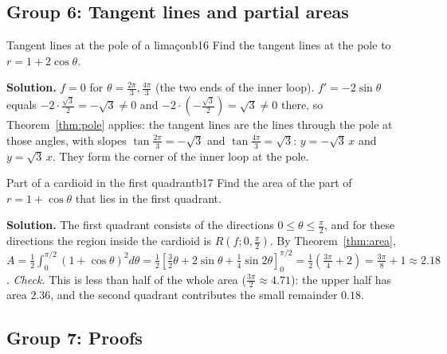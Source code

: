 \documentclass[11pt]{article}
\begin{document}
\subsection*{Group 6: Tangent lines and partial areas}

\begin{exmp}{Tangent lines at the pole of a limaçon}{b16}
Find the tangent lines at the pole to $r=1+2\cos\theta$.

\textbf{Solution.} $f=0$ for $\theta=\frac{2\pi}3,\frac{4\pi}3$ (the two ends of the inner loop). $f'=-2\sin\theta$ equals $-2\cdot\frac{\sqrt3}2=-\sqrt3\ne0$ and $-2\cdot\left(-\frac{\sqrt3}2\right)=\sqrt3\ne0$ there, so Theorem~\ref{thm:pole} applies: the tangent lines are the lines through the pole at those angles, with slopes $\tan\frac{2\pi}3=-\sqrt3$ and $\tan\frac{4\pi}3=\sqrt3$: $y=-\sqrt3\,x$ and $y=\sqrt3\,x$. They form the corner of the inner loop at the pole.
\end{exmp}

\begin{exmp}{Part of a cardioid in the first quadrant}{b17}
Find the area of the part of $r=1+\cos\theta$ that lies in the first quadrant.

\textbf{Solution.} The first quadrant consists of the directions $0\le\theta\le\frac\pi2$, and for these directions the region inside the cardioid is $R(f;0,\frac\pi2)$. By Theorem~\ref{thm:area}, $A=\frac12\int_0^{\pi/2}(1+\cos\theta)^2d\theta=\frac12\left[\frac32\theta+2\sin\theta+\frac14\sin2\theta\right]_0^{\pi/2}=\frac12\left(\frac{3\pi}4+2\right)=\frac{3\pi}8+1\approx2.18$. \emph{Check.} This is less than half of the whole area ($\frac{3\pi}2\approx4.71$): the upper half has area $2.36$, and the second quadrant contributes the small remainder $0.18$.
\end{exmp}

\subsection*{Group 7: Proofs}
\end{document}
